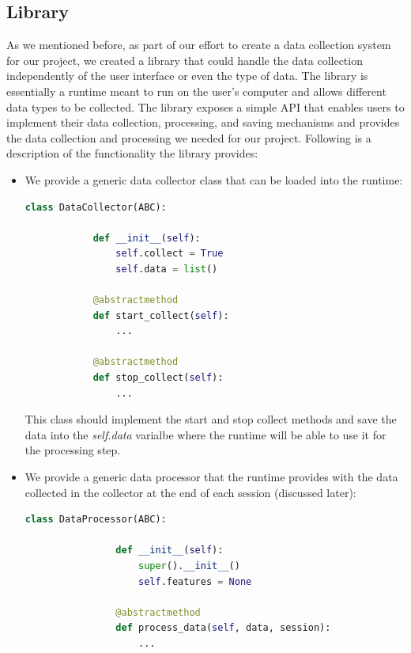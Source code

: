 \documentclass[../main.tex]{subfiles}
\begin{document}
\subsection{Library}
As we mentioned before, as part of our effort to create a data collection system for our project,
 we created a library that could handle the data collection independently of the user interface or even the type of data. 
 The library is essentially a runtime meant to run on the user's computer and allows different data types to be collected. 
 The library exposes a simple API that enables users to implement their data collection, 
 processing, and saving mechanisms and provides the data collection and processing we needed for our project. Following is a description of 
 the functionality the library provides: 

 \begin{itemize}
    \item We provide a generic data collector class that 	can be loaded into the runtime:
        \begin{lstlisting}[language=Python]
        class DataCollector(ABC):

            def __init__(self):
                self.collect = True
                self.data = list()

            @abstractmethod
            def start_collect(self):
                ...

            @abstractmethod
            def stop_collect(self):
                ...
        \end{lstlisting}
        This class should implement the start and stop collect methods and save the data into the \textit{self.data} varialbe where
        the runtime will be able to use it for the processing step.
    \item We provide a generic data processor that the runtime provides with the data collected in the collector at the end of each session (discussed later):
        \begin{lstlisting}[language=Python]
            class DataProcessor(ABC):

                def __init__(self):
                    super().__init__()
                    self.features = None

                @abstractmethod
                def process_data(self, data, session):
                    ...
        \end{lstlisting}


\end{itemize}
\end{document}
